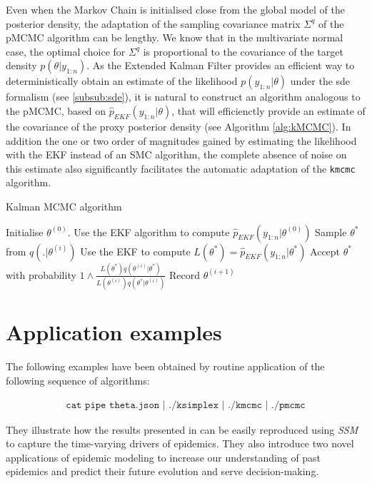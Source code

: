 \documentclass[a4paper,11pt,titlepage]{article}
\theoremstyle{plain} %
\begin{document}
Even when the Markov Chain is initialised close from the global model of the posterior density, the adaptation of the sampling covariance matrix $\Sigma^q$ of the pMCMC algorithm can be lengthy. We know that in the multivariate normal case, the optimal choice for $\Sigma^q$ is proportional to the covariance of the target density $p(\theta|y_{1:n})$. As the Extended Kalman Filter provides an efficient way to deterministically obtain an estimate of the likelihood $p(y_{1:n}|\theta)$ under the sde formalism (see \ref{subsub:sde}), it is natural to construct an algorithm analogous to the pMCMC, based on $\hat{p}_{EKF}(y_{1:n}|\theta)$, that will efficienctly provide an estimate of the covariance of the proxy posterior density (see Algorithm \ref{alg:kMCMC}). In addition the one or two order of magnitudes gained by estimating the likelihood with the EKF instead of an SMC algorithm, the complete absence of noise on this estimate also significantly facilitates the automatic adaptation of the \texttt{kmcmc} algorithm. 


\begin{algorithm}[h]
\caption{Kalman MCMC algorithm}
\label{alg:kMCMC}
{\fontsize{12}{20}\selectfont
\begin{algorithmic}
\STATE Initialise $\theta^{(0)}$.
\STATE Use the EKF algorithm to compute  $\hat{p}_{EKF}(y_{1:n}|\theta^{(0)})$
	\STATE Sample $\theta^{*}$ from $q(.|\theta^{(i)})$
	\STATE Use the EKF to compute $L(\theta^*)=\hat{p}_{EKF}(y_{1:n}|\theta^*)$ 
	\STATE Accept $\theta^{*}$ with probability $1\wedge\frac{L(\theta^{*})q(\theta^{(i)}|\theta^{*})}{L(\theta^{(i)})q(\theta^{*}|\theta^{(i)})}$
	\STATE Record $\theta^{(i+1)}$ 
\ENDFOR
\end{algorithmic}
}
\end{algorithm}

\section{\label{sec:applications}Application examples}

The following examples have been obtained by routine application of the following sequence of algorithms:

\begin{align}
\texttt{cat pipe theta.json | ./ksimplex | ./kmcmc | ./pmcmc}\nonumber
\end{align}

They illustrate how the results presented in \cite{Dureau2013a} can be easily reproduced using \emph{SSM} to capture the time-varying drivers of epidemics. They also introduce two novel applications of epidemic modeling to increase our understanding of past epidemics and predict their future evolution and serve decision-making.
\end{document}
